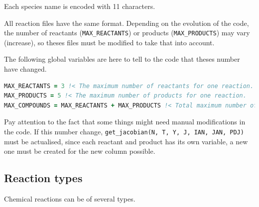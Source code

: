 \documentclass[english,a4paper,twoside]{article}
\begin{document}
\bigskip

Each species name is encoded with 11 characters.

All reaction files have the same format. Depending on the evolution of the code, the number of reactants (\verb|MAX_REACTANTS|) or products (\verb|MAX_PRODUCTS|) may vary (increase), so theses files must be modified to take that into account. 

The following global variables are here to tell to the code that theses number have changed. 
\begin{lstlisting}[language=Fortran]
MAX_REACTANTS = 3 !< The maximum number of reactants for one reaction.
MAX_PRODUCTS = 5 !< The maximum number of products for one reaction.
MAX_COMPOUNDS = MAX_REACTANTS + MAX_PRODUCTS !< Total maximum number of compounds for one reaction (reactants + products)
\end{lstlisting}

\begin{attention}
Pay attention to the fact that some things might need manual modifications in the code. If this number change, \verb|get_jacobian(N, T, Y, J, IAN, JAN, PDJ)| must be actualised, since each reactant and product has its own variable, a new one must be created for the new column possible. 
\end{attention}

\subsection{Reaction types}
Chemical reactions can be of several types. 
\end{document}
